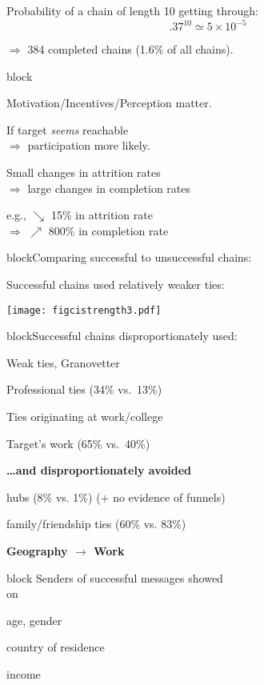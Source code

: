     Probability of a chain of length 10 getting through:
    $$.37^{10} \simeq 5 \times 10^{-5}$$
  
  $\Rightarrow$ 384 completed chains (1.6\% of all chains).
  
  
  
{block}{}
  
    
    Motivation/Incentives/Perception matter.
    
    If target \textit{seems} reachable\\
    $\Rightarrow$ participation more likely.
    
    Small changes in attrition rates\\
    $\Rightarrow$ large changes in completion rates
    
    e.g., $\searrow$ 15\% in attrition rate \\
    $\Rightarrow$ $\nearrow$ 800\% in completion rate
  
  

{block}{Comparing successful to unsuccessful chains:}
    
     
      Successful chains used relatively weaker ties:
    
    \texttt{[image: figcistrength3.pdf]}
  

{block}{Successful chains disproportionately used:}
    
     
      Weak ties, Granovetter\cite{granovetter1973a}
     
      Professional ties (34\% vs.\ 13\%)
     
      Ties originating at work/college
     
      Target's work (65\% vs.\ 40\%)
    
  
  
  \textbf{\ldots and disproportionately avoided}
    
     
      hubs (8\% vs. 1\%) (+ no evidence of funnels)
    
      family/friendship ties (60\% vs. 83\%)
    
  

  \textbf{Geography $\rightarrow$ Work}
    

{block}{}
  Senders of successful messages showed\\
   on
  
  
    age, gender
  
    country of residence
   
    income
   
